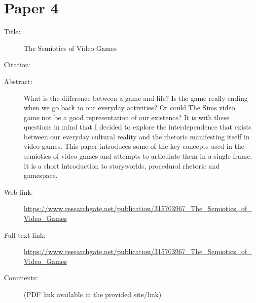 \documentclass{scrartcl}
\begin{document}
\section*{Paper 4}
\begin{description}
\item[Title:] The Semiotics of Video Games
\item[Citation:] \cite{Bruchansky}
\item[Abstract:] What is the difference between a game and life? Is the game really ending when we go back to our everyday activities? Or could The Sims video game not be a good representation of our existence? It is with these questions in mind that I decided to explore the interdependence that exists between our everyday cultural reality and the rhetoric manifesting itself in video games. This paper introduces some of the key concepts used in the semiotics of video games and attempts to articulate them in a single frame. It is a short introduction to storyworlds, procedural rhetoric and gamespace. 
\item[Web link:]\url {https://www.researchgate.net/publication/315703967_The_Semiotics_of_Video_Games}
\item[Full text link:]\url {https://www.researchgate.net/publication/315703967_The_Semiotics_of_Video_Games}
\item[Comments:] (PDF link available in the provided site/link)
\end{description}
\end{document}
